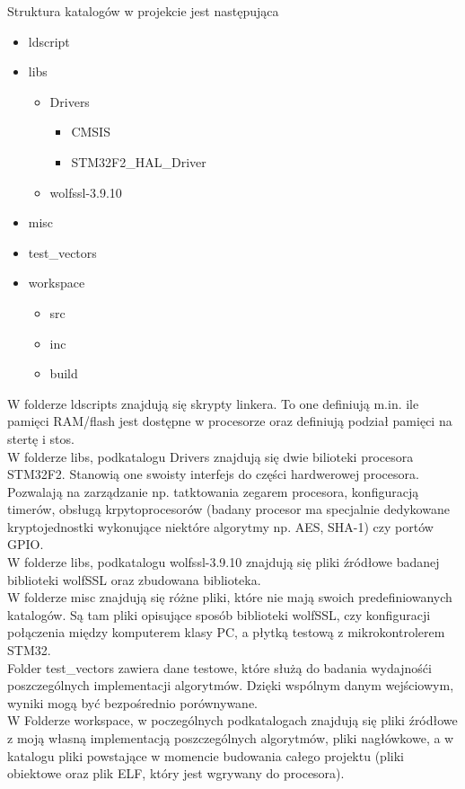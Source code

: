 \documentclass[oneside]{mgr}
\begin{document}
Struktura katalogów w projekcie jest następująca 
\begin{itemize}
\item{ldscript}
\item{libs}
\begin{itemize}
\item{Drivers}
\begin{itemize}
\item{CMSIS}
\item{STM32F2\_HAL\_Driver}
\end{itemize}
\item{wolfssl-3.9.10}
\end{itemize}
\item{misc}
\item{test\_vectors}
\item{workspace}
\begin{itemize}
\item{src}
\item{inc}
\item{build}
\end{itemize}
\end{itemize}

W folderze ldscripts znajdują się skrypty linkera. To one definiują m.in. ile pamięci RAM/flash jest dostępne w procesorze oraz definiują podział pamięci na stertę i stos.\\
W folderze libs, podkatalogu Drivers znajdują się dwie bilioteki procesora STM32F2. Stanowią one swoisty interfejs do części hardwerowej procesora. Pozwalają na zarządzanie np. tatktowania zegarem procesora, konfiguracją timerów, obsługą krpytoprocesorów (badany procesor ma specjalnie dedykowane kryptojednostki wykonujące niektóre algorytmy np. AES, SHA-1) czy portów GPIO.\\
W folderze libs, podkatalogu wolfssl-3.9.10 znajdują się pliki źródłowe badanej biblioteki wolfSSL oraz zbudowana biblioteka.\\
W folderze misc znajdują się różne pliki, które nie mają swoich predefiniowanych katalogów. Są tam pliki opisujące sposób biblioteki wolfSSL, czy konfiguracji połączenia między komputerem klasy PC, a płytką testową z mikrokontrolerem STM32.\\
Folder test\_vectors zawiera dane testowe, które służą do badania wydajnośći poszczególnych implementacji algorytmów. Dzięki wspólnym danym wejściowym, wyniki mogą być bezpośrednio porównywane.\\
W Folderze workspace, w poczególnych podkatalogach znajdują się pliki źródłowe z moją własną implementacją poszczególnych algorytmów, pliki nagłówkowe, a w katalogu pliki powstające w momencie budowania całego projektu (pliki obiektowe oraz plik ELF, który jest wgrywany do procesora).
\end{document}
